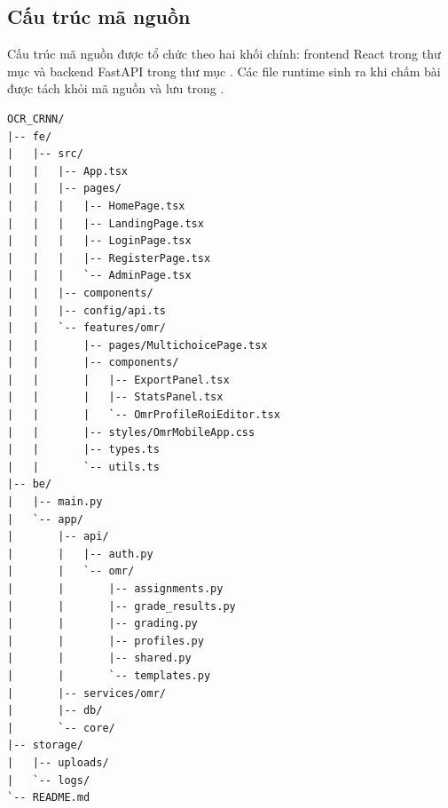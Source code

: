 \subsection{Cấu trúc mã nguồn}

Cấu trúc mã nguồn được tổ chức theo hai khối chính: frontend React trong thư mục  và backend FastAPI trong thư mục . Các file runtime sinh ra khi chấm bài được tách khỏi mã nguồn và lưu trong .

\begin{lstlisting}[caption={Cấu trúc thư mục chính của hệ thống}, label={lst:source_tree}, basicstyle=\ttfamily\small, breaklines=true, frame=single, showstringspaces=false]
OCR_CRNN/
|-- fe/
|   |-- src/
|   |   |-- App.tsx
|   |   |-- pages/
|   |   |   |-- HomePage.tsx
|   |   |   |-- LandingPage.tsx
|   |   |   |-- LoginPage.tsx
|   |   |   |-- RegisterPage.tsx
|   |   |   `-- AdminPage.tsx
|   |   |-- components/
|   |   |-- config/api.ts
|   |   `-- features/omr/
|   |       |-- pages/MultichoicePage.tsx
|   |       |-- components/
|   |       |   |-- ExportPanel.tsx
|   |       |   |-- StatsPanel.tsx
|   |       |   `-- OmrProfileRoiEditor.tsx
|   |       |-- styles/OmrMobileApp.css
|   |       |-- types.ts
|   |       `-- utils.ts
|-- be/
|   |-- main.py
|   `-- app/
|       |-- api/
|       |   |-- auth.py
|       |   `-- omr/
|       |       |-- assignments.py
|       |       |-- grade_results.py
|       |       |-- grading.py
|       |       |-- profiles.py
|       |       |-- shared.py
|       |       `-- templates.py
|       |-- services/omr/
|       |-- db/
|       `-- core/
|-- storage/
|   |-- uploads/
|   `-- logs/
`-- README.md
\end{lstlisting}

